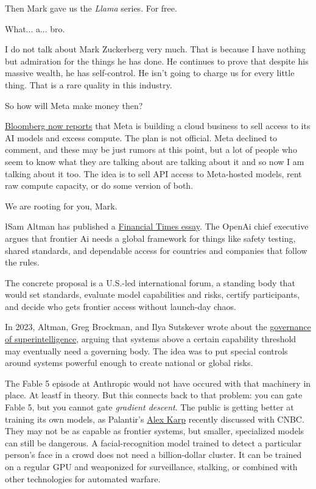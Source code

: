 \documentclass{news}
\begin{document}
Then Mark gave us the \emph{Llama} series. For free.

What... a... bro.

I do not talk about Mark Zuckerberg very much. That is because I have nothing but admiration for the things he has done. He continues to prove that despite his massive wealth, he has self-control. He isn't going to charge us for every little thing. That is a rare quality in this industry.

So how will Meta make money then?

\href{https://www.bloomberg.com/news/articles/2026-07-01/meta-is-building-a-cloud-business-to-sell-excess-ai-compute}{Bloomberg now reports} that Meta is building a cloud business to sell access to its AI models and excess compute. The plan is not official. Meta declined to comment, and these may be just rumors at this point, but a lot of people who seem to know what they are talking about are talking about it and so now I am talking about it too. The idea is to sell API access to Meta-hosted models, rent raw compute capacity, or do some version of both.

We are rooting for you, Mark. 

{\l{S}am Altman has published a \href{https://www.ft.com/content/0c2e1077-f658-4b3d-9040-602615c961ca}{Financial Times essay}. The OpenAi chief executive argues that frontier Ai needs a global framework for things like safety testing, shared standards, and dependable access for countries and companies that follow the rules.
\par}

The concrete proposal is a U.S.-led international forum, a standing body that would set standards, evaluate model capabilities and risks, certify participants, and decide who gets frontier access without launch-day chaos.

In 2023, Altman, Greg Brockman, and Ilya Sutskever wrote about the \href{https://openai.com/index/governance-of-superintelligence/}{governance of superintelligence}, arguing that systems above a certain capability threshold may eventually need a governing body. The idea was to put special controls around systems powerful enough to create national or global risks.

The Fable 5 episode at Anthropic would not have occured with that machinery in place. At leastf in theory. But this connects back to that problem: you can gate Fable 5, but you cannot gate \emph{gradient descent}. The public is getting better at training its own models, as Palantir's \href{https://www.cnbc.com/2026/07/01/palantir-karp-open-ai-anthropic-tokens.html}{Alex Karp} recently discussed with CNBC. They may not be as capable as frontier systems, but smaller, specialized models can still be dangerous. A facial-recognition model trained to detect a particular person's face in a crowd does not need a billion-dollar cluster. It can be trained on a regular GPU and weaponized for surveillance, stalking, or combined with other technologies for automated warfare.
\end{document}
